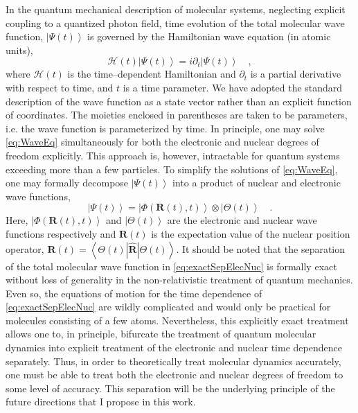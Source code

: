 \documentclass[12pt]{article}
\newcommand{\ket}[1]{\left\vert #1 \right\rangle}         %
\newcommand{\innerop}[3]{\left\langle #1 \left\vert #2 \right\vert #3 \right\rangle}  %
\newcommand*\vc[1]{\boldsymbol{#1}}
\begin{document}
In the quantum mechanical description of molecular systems, neglecting explicit
coupling to a quantized photon field, time evolution of the total molecular wave
function, $\ket{\Psi (t)}$ is governed by the Hamiltonian wave equation 
(in atomic units),
\begin{equation}
\mathscr{H}(t) \ket{\Psi (t)} = i\partial_t \ket{\Psi(t)} \quad,
\label{eq:WaveEq}
\end{equation}
where $\mathscr{H}(t)$ is the time--dependent Hamiltonian and $\partial_t$ is a
partial derivative with respect to time, and $t$ is a time parameter. We have
adopted the standard description of the wave function as a state vector rather
than an explicit function of coordinates. The moieties enclosed in parentheses
are taken to be parameters, i.e. the wave function is parameterized by time.
In principle, one may solve \cref{eq:WaveEq} simultaneously for both the 
electronic and nuclear degrees of freedom explicitly. This approach is, however,
intractable for quantum systems exceeding more than a few particles. To simplify
the solutions of \cref{eq:WaveEq}, one may formally decompose $\ket{\Psi (t)}$
into a product of nuclear and electronic wave functions,
\begin{equation} 
\ket{\Psi (t)} = \ket{\Phi(\vc{R}(t),t)}\otimes\ket{\Theta(t)} 
\quad .  
\label{eq:exactSepElecNuc}
\end{equation} 
Here, $\ket{\Phi(\vc{R}(t),t)}$ and $\ket{\Theta (t)}$ are the electronic and
nuclear wave functions respectively and $\vc{R}(t)$ is the expectation value of
the nuclear position operator, $\vc{R}(t) =
\innerop{\Theta(t)}{\hat{\vc{R}}}{\Theta(t)}$.  It should be noted that the
separation of the total molecular wave function in \cref{eq:exactSepElecNuc} is
formally exact\cite{Gross10_PRL123002, Cederbaum08_JCP124101} without loss of
generality in the non-relativistic treatment of quantum mechanics. Even so, the
equations of motion for the time dependence of \cref{eq:exactSepElecNuc} are
wildly complicated\cite{Ghosh15_MP1} and would only be practical for molecules
consisting of a few atoms.  Nevertheless, this explicitly exact treatment allows
one to, in principle, bifurcate the treatment of quantum molecular dynamics into
explicit treatment of the electronic and nuclear time dependence separately.
Thus, in order to theoretically treat molecular dynamics accurately, one must be
able to treat both the electronic and nuclear degrees of freedom to some level
of accuracy.  This separation will be the underlying principle of the future
directions that I propose in this work.
\end{document}
